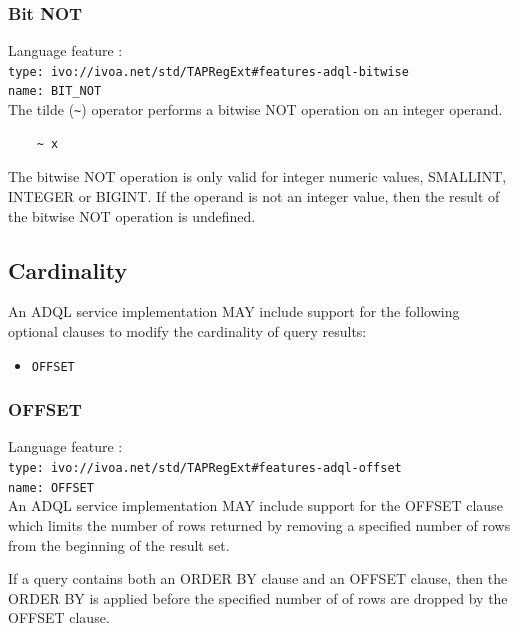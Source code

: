 \documentclass[11pt,a4paper]{ivoa}
\begin{document}
\subsubsection{Bit NOT}
\label{sec:bitwise.not}
{\footnotesize Language feature :}\\
{\footnotesize \verb|type: ivo://ivoa.net/std/TAPRegExt#features-adql-bitwise|}\\
{\footnotesize \verb|name: BIT_NOT|}\\

The tilde (\verb:~:) operator performs a bitwise NOT operation on an integer operand.

\begin{verbatim}
    ~ x
\end{verbatim}

The bitwise NOT operation is only valid for integer numeric values, 
SMALLINT, INTEGER or BIGINT.
If the operand is not an integer value, then the result of the bitwise
NOT operation is undefined.

\subsection{Cardinality}
\label{sec:cardinality}

An ADQL service implementation MAY include support for the following optional
clauses to modify the cardinality of query results:

\begin{itemize}
    \item \verb:OFFSET:
\end{itemize}

\subsubsection{OFFSET}
\label{sec:offset}

{\footnotesize Language feature :}\\
{\footnotesize \verb|type: ivo://ivoa.net/std/TAPRegExt#features-adql-offset|}\\
{\footnotesize \verb|name: OFFSET|}\\

An ADQL service implementation MAY include support for the OFFSET clause
which limits the number of rows returned by removing a specified number
of rows from the beginning of the result set.

If a query contains both an ORDER BY clause and an OFFSET clause,
then the ORDER BY is applied before the specified number of 
of rows are dropped by the OFFSET clause.
\end{document}
